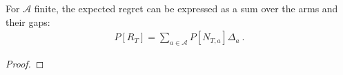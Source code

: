 \begin{corollary}\label{cor:integral_regret_eq_sum_mul}
  \leanok
For $\mathcal{A}$ finite, the expected regret can be expressed as a sum over the arms and their gaps:
\begin{align*}
  P[R_T] = \sum_{a \in \mathcal{A}}P[N_{T,a}] \Delta_a \: .
\end{align*}
\end{corollary}

\begin{proof}\leanok

\end{proof}
